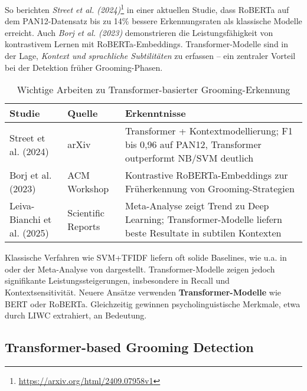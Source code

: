  So berichten \emph{Street et al. (2024)}\footnote{\url{https://arxiv.org/html/2409.07958v1}} in einer aktuellen Studie, dass RoBERTa auf dem PAN12-Datensatz bis zu 14\% bessere Erkennungsraten als klassische Modelle erreicht. Auch \emph{Borj et al. (2023)} demonstrieren die Leistungsfähigkeit von kontrastivem Lernen mit RoBERTa-Embeddings. Transformer-Modelle sind in der Lage, \emph{Kontext und sprachliche Subtilitäten} zu erfassen – ein zentraler Vorteil bei der Detektion früher Grooming-Phasen.
\begin{table}[h]
\centering
\begin{tabular}{@{}p{4cm}p{3cm}p{6cm}@{}}
\toprule
\textbf{Studie} & \textbf{Quelle} & \textbf{Erkenntnisse} \\
\midrule
Street et al. (2024) & arXiv & Transformer + Kontextmodellierung; F1 bis 0{,}96 auf PAN12, Transformer outperformt NB/SVM deutlich \\
Borj et al. (2023) & ACM Workshop & Kontrastive RoBERTa-Embeddings zur Früherkennung von Grooming-Strategien \\
Leiva-Bianchi et al. (2025) & Scientific Reports & Meta-Analyse zeigt Trend zu Deep Learning; Transformer-Modelle liefern beste Resultate in subtilen Kontexten \\
\bottomrule
\end{tabular}
\caption{Wichtige Arbeiten zu Transformer-basierter Grooming-Erkennung}
\end{table}
Klassische Verfahren wie SVM+TFIDF liefern oft solide Baselines, wie u.a. in \parencite{inches2012pan} oder der Meta-Analyse von \parencite{leiva2025meta} dargestellt. Transformer-Modelle zeigen jedoch signifikante Leistungssteigerungen, insbesondere in Recall und Kontextsensitivität. 
Neuere Ansätze verwenden \textbf{Transformer-Modelle} wie BERT oder RoBERTa. Gleichzeitig gewinnen psycholinguistische Merkmale, etwa durch LIWC extrahiert, an Bedeutung.
\subsection{Transformer-based Grooming Detection}








